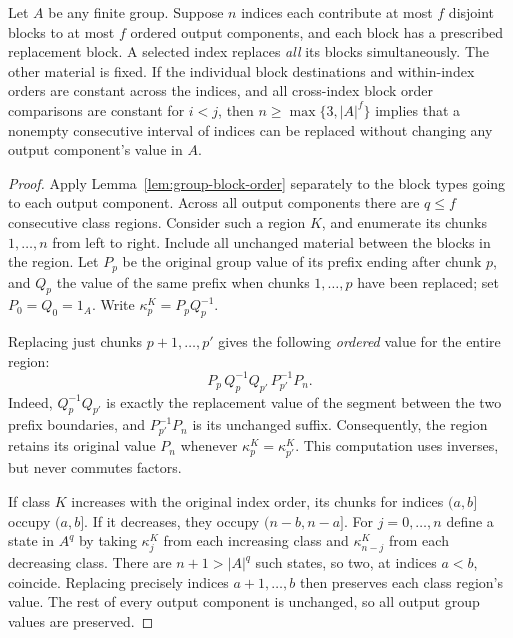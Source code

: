 \begin{lemma}
\label{lem:group-interval}
Let $A$ be any finite group.  Suppose $n$ indices each
contribute at most $f$ disjoint blocks to at most $f$
ordered output components, and each block has a prescribed
replacement block.  A selected index replaces \emph{all}
its blocks simultaneously.  The other material is fixed.
If the individual block destinations and within-index orders
are constant across the indices, and all cross-index block
order comparisons are constant for $i<j$, then
$n\ge\max\{3,|A|^f\}$ implies that a nonempty consecutive
interval of indices can be replaced without changing
any output component's value in $A$.
\end{lemma}
\begin{proof}
Apply Lemma~\ref{lem:group-block-order} separately to
the block types going to each output component.  Across
all output components there are $q\le f$ consecutive
class regions.  Consider such a region $K$, and enumerate
its chunks $1,\ldots,n$ from left to right.  Include all
unchanged material between the blocks in the region.
Let $P_p$ be the original group value of its prefix
ending after chunk $p$, and $Q_p$ the value of the
same prefix when chunks $1,\ldots,p$ have been
replaced; set $P_0=Q_0=1_A$.  Write
$\kappa^K_p=P_pQ_p^{-1}$.

Replacing just chunks $p+1,\ldots,p'$ gives the
following \emph{ordered} value for the entire region:
\[
 P_p\,Q_p^{-1}Q_{p'}\,P_{p'}^{-1}P_n .
\]
Indeed, $Q_p^{-1}Q_{p'}$ is exactly the replacement
value of the segment between the two prefix boundaries,
and $P_{p'}^{-1}P_n$ is its unchanged suffix.
Consequently, the region retains its original value
$P_n$ whenever $\kappa^K_p=\kappa^K_{p'}$.
This computation uses inverses, but never commutes
factors.

If class $K$ increases with the original index order,
its chunks for indices $(a,b]$ occupy $(a,b]$.
If it decreases, they occupy $(n-b,n-a]$.
For $j=0,\ldots,n$ define a state in $A^q$ by taking
$\kappa^K_j$ from each increasing class and
$\kappa^K_{n-j}$ from each decreasing class.
There are $n+1>|A|^q$ such states, so two,
at indices $a<b$, coincide.  Replacing precisely
indices $a+1,\ldots,b$ then preserves each
class region's value.  The rest of every output
component is unchanged, so all output group values
are preserved.
\end{proof}

